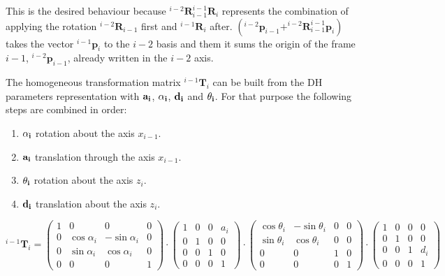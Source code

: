 This is the desired behaviour because $^{i-2} \mathbf{R}_{i-1} ^{i-1} \mathbf{R}_{i}$ represents the combination of applying the rotation $^{i-2} \mathbf{R}_{i-1}$ first and $^{i-1} \mathbf{R}_{i}$ after. $(^{i-2} \boldsymbol{p}_{i-1} +  ^{i-2} \mathbf{R}_{i-1} ^{i-1} \boldsymbol{p}_{i})$ takes the vector $^{i-1} \boldsymbol{p}_{i}$ to the $i-2$ basis and them it sums the origin of the frame $i-1$, $^{i-2} \boldsymbol{p}_{i-1}$, already written in the $i-2$ axis.

The homogeneous transformation matrix $^{i-1}\mathbf{T}_{i}$ can be built from the DH parameters representation with $\bf{a_i}$, $\bf{\alpha_i}$, $\bf{d_i}$ and $\bf{\theta_i}$. For that purpose the following steps are combined in order:
\begin{enumerate}
    \item $\bf{\alpha_i}$ rotation about the axis $x_{i-1}$.
    \item $\bf{a_i}$ translation through the axis $x_{i-1}$.
    \item $\bf{\theta_i}$ rotation about the axis $z_{i}$.
    \item $\bf{d_i}$ translation about the axis $z_{i}$.
\end{enumerate}


$$
^{i-1}\mathbf{T}_{i} =
\left(\begin{array}{cccc}
1 & 0 & 0 & 0 \\
0 & \cos \alpha_{i} & - \sin \alpha_{i} & 0 \\
0 & \sin \alpha_{i} & \cos \alpha_{i} & 0 \\
0 & 0 & 0 & 1
\end{array}\right) \cdot
\left(\begin{array}{cccc}
1 & 0 & 0 & a_{i} \\
0 & 1 & 0 & 0 \\
0 & 0 & 1 & 0 \\
0 & 0 & 0 & 1
\end{array}\right) \cdot
\left(\begin{array}{cccc}
\cos \theta_{i} & - \sin \theta_{i} & 0 & 0 \\
\sin \theta_{i} & \cos \theta_{i} & 0 & 0 \\
0 & 0 & 1 & 0 \\
0 & 0 & 0 & 1
\end{array}\right) \cdot
\left(\begin{array}{cccc}
1 & 0 & 0 & 0 \\
0 & 1 & 0 & 0 \\
0 & 0 & 1 & d_{i} \\
0 & 0 & 0 & 1
\end{array}\right)
$$

